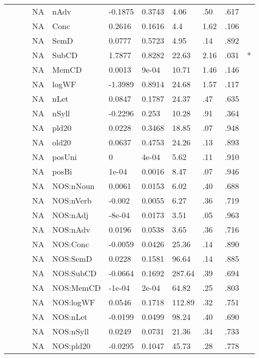 \begin{table}[ht]
\begin{tabular}{lllllllllll}
   &  &  & NA & nAdv & -0.1875 & 0.3743 & 4.06 & .50 & .617 &   \\ 
   &  &  & NA & Conc & 0.2616 & 0.1616 & 4.4 & 1.62 & .106 &   \\ 
   &  &  & NA & SemD & 0.0777 & 0.5723 & 4.95 & .14 & .892 &   \\ 
   &  &  & NA & SubCD & 1.7877 & 0.8282 & 22.63 & 2.16 & .031 & * \\ 
   &  &  & NA & MemCD & 0.0013 & 9e-04 & 10.71 & 1.46 & .146 &   \\ 
   &  &  & NA & logWF & -1.3989 & 0.8914 & 24.68 & 1.57 & .117 &   \\ 
   &  &  & NA & nLet & 0.0847 & 0.1787 & 24.37 & .47 & .635 &   \\ 
   &  &  & NA & nSyll & -0.2296 & 0.253 & 10.28 & .91 & .364 &   \\ 
   &  &  & NA & pld20 & 0.0228 & 0.3468 & 18.85 & .07 & .948 &   \\ 
   &  &  & NA & old20 & 0.0637 & 0.4753 & 24.26 & .13 & .893 &   \\ 
   &  &  & NA & posUni & 0 & 4e-04 & 5.62 & .11 & .910 &   \\ 
   &  &  & NA & posBi & 1e-04 & 0.0016 & 8.47 & .07 & .946 &   \\ 
   &  &  & NA & NOS:nNoun & 0.0061 & 0.0153 & 6.02 & .40 & .688 &   \\ 
   &  &  & NA & NOS:nVerb & -0.002 & 0.0055 & 6.27 & .36 & .719 &   \\ 
   &  &  & NA & NOS:nAdj & -8e-04 & 0.0173 & 3.51 & .05 & .963 &   \\ 
   &  &  & NA & NOS:nAdv & 0.0196 & 0.0538 & 3.65 & .36 & .716 &   \\ 
   &  &  & NA & NOS:Conc & -0.0059 & 0.0426 & 25.36 & .14 & .890 &   \\ 
   &  &  & NA & NOS:SemD & 0.0228 & 0.1581 & 96.64 & .14 & .885 &   \\ 
   &  &  & NA & NOS:SubCD & -0.0664 & 0.1692 & 287.64 & .39 & .694 &   \\ 
   &  &  & NA & NOS:MemCD & -1e-04 & 2e-04 & 64.82 & .25 & .803 &   \\ 
   &  &  & NA & NOS:logWF & 0.0546 & 0.1718 & 112.89 & .32 & .751 &   \\ 
   &  &  & NA & NOS:nLet & -0.0199 & 0.0499 & 98.24 & .40 & .690 &   \\ 
   &  &  & NA & NOS:nSyll & 0.0249 & 0.0731 & 21.36 & .34 & .733 &   \\ 
   &  &  & NA & NOS:pld20 & -0.0295 & 0.1047 & 45.73 & .28 & .778 &   \\ 

\end{tabular}
\end{table}
